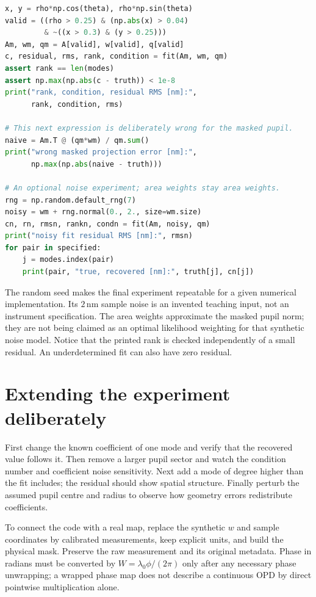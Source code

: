 \begin{lstlisting}[language=Python,caption={A self-contained Zernike fitting experiment.}]
x, y = rho*np.cos(theta), rho*np.sin(theta)
valid = ((rho > 0.25) & (np.abs(x) > 0.04)
         & ~((x > 0.3) & (y > 0.25)))
Am, wm, qm = A[valid], w[valid], q[valid]
c, residual, rms, rank, condition = fit(Am, wm, qm)
assert rank == len(modes)
assert np.max(np.abs(c - truth)) < 1e-8
print("rank, condition, residual RMS [nm]:",
      rank, condition, rms)

# This next expression is deliberately wrong for the masked pupil.
naive = Am.T @ (qm*wm) / qm.sum()
print("wrong masked projection error [nm]:",
      np.max(np.abs(naive - truth)))

# An optional noise experiment; area weights stay area weights.
rng = np.random.default_rng(7)
noisy = wm + rng.normal(0., 2., size=wm.size)
cn, rn, rmsn, rankn, condn = fit(Am, noisy, qm)
print("noisy fit residual RMS [nm]:", rmsn)
for pair in specified:
    j = modes.index(pair)
    print(pair, "true, recovered [nm]:", truth[j], cn[j])
\end{lstlisting}

The random seed makes the final experiment repeatable for a given
numerical implementation. Its $2\,\mathrm{nm}$ sample noise is an
invented teaching input, not an instrument specification. The area
weights approximate the masked pupil norm; they are not being claimed
as an optimal likelihood weighting for that synthetic noise model.
Notice that the printed rank is checked independently of a small
residual. An underdetermined fit can also have zero residual.

\section{Extending the experiment deliberately}
First change the known coefficient of one mode and verify that the
recovered value follows it. Then remove a larger pupil sector and
watch the condition number and coefficient noise sensitivity. Next
add a mode of degree higher than the fit includes; the residual should
show spatial structure. Finally perturb the assumed pupil centre and
radius to observe how geometry errors redistribute coefficients.

To connect the code with a real map, replace the synthetic $w$ and
sample coordinates by calibrated measurements, keep explicit units,
and build the physical mask. Preserve the raw measurement and its
original metadata. Phase in radians must be converted by
$W=\lambda_0\phi/(2\pi)$ only after any necessary phase unwrapping;
a wrapped phase map does not describe a continuous OPD by direct
pointwise multiplication alone.

